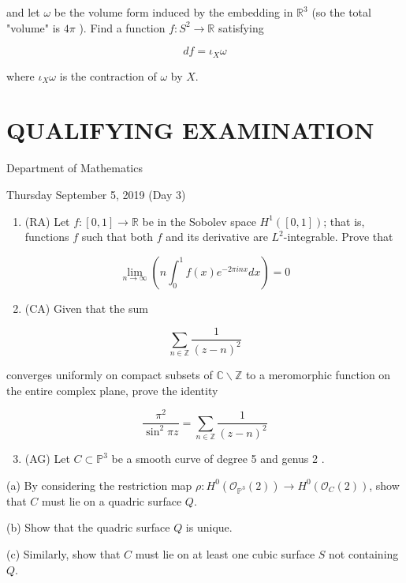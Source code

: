 \documentclass[10pt]{article}
\begin{document}
and let $\omega$ be the volume form induced by the embedding in $\mathbb{R}^{3}$ (so the total "volume" is $4 \pi$ ). Find a function $f: S^{2} \rightarrow \mathbb{R}$ satisfying

$$
d f=\iota_{X} \omega
$$

where $\iota_{X} \omega$ is the contraction of $\omega$ by $X$.

\section*{QUALIFYING EXAMINATION }
Department of Mathematics

Thursday September 5, 2019 (Day 3)

\begin{enumerate}
  \item (RA) Let $f:[0,1] \rightarrow \mathbb{R}$ be in the Sobolev space $H^{1}([0,1])$; that is, functions $f$ such that both $f$ and its derivative are $L^{2}$-integrable. Prove that
\end{enumerate}

$$
\lim _{n \rightarrow \infty}\left(n \int_{0}^{1} f(x) e^{-2 \pi i n x} d x\right)=0
$$

\begin{enumerate}
  \setcounter{enumi}{1}
  \item (CA) Given that the sum
\end{enumerate}

$$
\sum_{n \in \mathbb{Z}} \frac{1}{(z-n)^{2}}
$$

converges uniformly on compact subsets of $\mathbb{C} \backslash \mathbb{Z}$ to a meromorphic function on the entire complex plane, prove the identity

$$
\frac{\pi^{2}}{\sin ^{2} \pi z}=\sum_{n \in \mathbb{Z}} \frac{1}{(z-n)^{2}}
$$

\begin{enumerate}
  \setcounter{enumi}{2}
  \item (AG) Let $C \subset \mathbb{P}^{3}$ be a smooth curve of degree 5 and genus 2 .
\end{enumerate}

(a) By considering the restriction map $\rho: H^{0}\left(\mathcal{O}_{\mathbb{P}^{3}}(2)\right) \rightarrow H^{0}\left(\mathcal{O}_{C}(2)\right)$, show that $C$ must lie on a quadric surface $Q$.

(b) Show that the quadric surface $Q$ is unique.

(c) Similarly, show that $C$ must lie on at least one cubic surface $S$ not containing $Q$.
\end{document}
